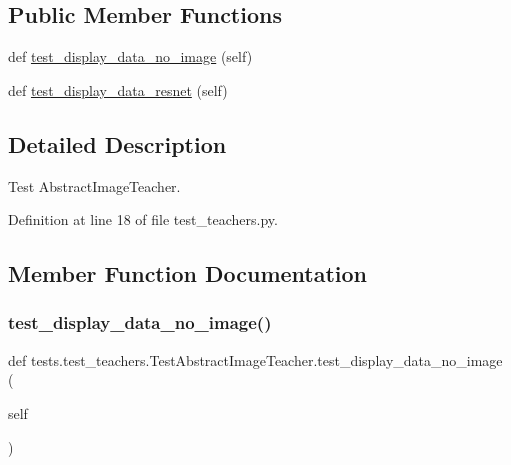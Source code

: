 \subsection*{Public Member Functions}
\begin{DoxyCompactItemize}
\item 
def \hyperlink{classtests_1_1test__teachers_1_1TestAbstractImageTeacher_a0c3fc24195da064d6a8508b23dea6bcd}{test\+\_\+display\+\_\+data\+\_\+no\+\_\+image} (self)
\item 
def \hyperlink{classtests_1_1test__teachers_1_1TestAbstractImageTeacher_a6b10fb441cd4f93aa4eceba77d659abf}{test\+\_\+display\+\_\+data\+\_\+resnet} (self)
\end{DoxyCompactItemize}


\subsection{Detailed Description}
\begin{DoxyVerb}Test AbstractImageTeacher.
\end{DoxyVerb}
 

Definition at line 18 of file test\+\_\+teachers.\+py.



\subsection{Member Function Documentation}
\mbox{\label{classtests_1_1test__teachers_1_1TestAbstractImageTeacher_a0c3fc24195da064d6a8508b23dea6bcd}} 
\subsubsection{\texorpdfstring{test\+\_\+display\+\_\+data\+\_\+no\+\_\+image()}{test\_display\_data\_no\_image()}}
{\footnotesize\ttfamily def tests.\+test\+\_\+teachers.\+Test\+Abstract\+Image\+Teacher.\+test\+\_\+display\+\_\+data\+\_\+no\+\_\+image (\begin{DoxyParamCaption}\item[{}]{self }\end{DoxyParamCaption})}

